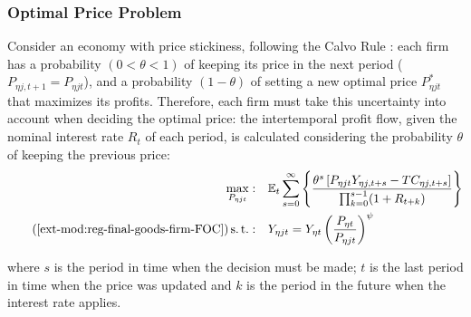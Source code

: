 \documentclass[../thesis.tex]{subfiles}
\begin{document}
\begin{comment}
	
As salaries and technology are the same for all firms in region $\eta$, the $j$ index can be dropped from the marginal cost $\Lambda$:
\begin{alignat}{2}
	\Lambda_{\eta t} = \frac{W_{\eta t}}{Z_{A\eta t}} \label{ext-mod:reg-int-good-firm-prod-function}
\end{alignat}

Notice that:
\begin{align}
	TC_{\eta jt} &= W_{\eta t} L_{\eta jt} = \Lambda_{\eta t} Y_{\eta jt} 
	MC_{\eta jt} &= \frac{\partial TC_{\eta jt}}{\partial Y_{\eta jt}} = \Lambda_{\eta t} \nonumber
\end{align}

\end{comment}


\subsubsection*{Optimal Price Problem}

Consider an economy with price stickiness, following the Calvo Rule \cite{calvo_staggered_1983}: each firm has a probability $(0 < \theta < 1)$ of keeping its price in the next period ($P_{\eta j,t+1} = P_{\eta jt}$), and a probability $(1 - \theta)$ of setting a new optimal price $P_{\eta jt}^{\ast}$ that maximizes its profits. Therefore, each firm must take this uncertainty into account when deciding the optimal price: the intertemporal profit flow, given the nominal interest rate $R_{t}$ of each period, is calculated considering the probability $\theta$ of keeping the previous price:
\begin{align}
	\label{ext-mod:reg-int-good-firm-optimal-price-problem}
	\max_{P_{\eta jt}}: & \quad \E \sum_{s=0}^{\infty} \left\{ \frac{ \theta^s \left[ P_{\eta jt} Y_{\eta j,t+s} - TC_{\eta j,t+s} \right]}{\prod_{k=0}^{s-1}(1+R_{t+k})} \right\} \\
	\tag{\ref{ext-mod:reg-final-goods-firm-FOC}}
	\st: & \quad Y_{\eta jt} = Y_{\eta t} \left( \frac{P_{\eta t}}{P_{\eta jt}} \right)^{\psi}
\end{align}

where $s$ is the period in time when the decision must be made; $t$ is the last period in time when the price was updated and $k$ is the period in the future when the interest rate applies.
\end{document}
